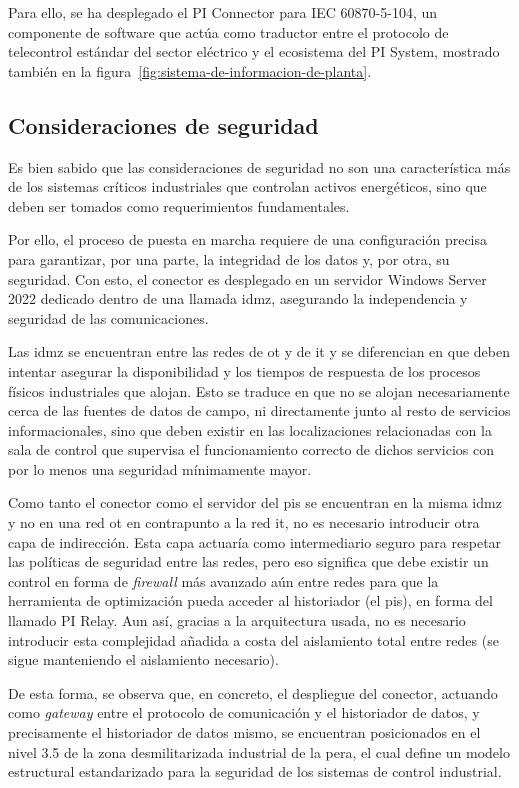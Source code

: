 Para ello, se ha desplegado el PI Connector para IEC 60870{-}5{-}104, un componente de software que actúa como traductor entre el protocolo de telecontrol estándar del sector eléctrico y el ecosistema del PI System, mostrado también en la figura~\ref{fig:sistema-de-informacion-de-planta}.

\subsection{Consideraciones de seguridad}%
\label{makereference3.4.2}

Es bien sabido que las consideraciones de seguridad no son una característica más de los sistemas críticos industriales que controlan activos energéticos, sino que deben ser tomados como requerimientos fundamentales.

Por ello, el proceso de puesta en marcha requiere de una configuración precisa para garantizar, por una parte, la integridad de los datos y, por otra, su seguridad. Con esto, el conector es desplegado en un servidor Windows Server 2022 dedicado dentro de una llamada \gls{idmz}, asegurando la independencia y seguridad de las comunicaciones.

Las \gls{idmz} se encuentran entre las redes de \gls{ot} y de \gls{it} y se diferencian en que deben intentar asegurar la disponibilidad y los tiempos de respuesta de los procesos físicos industriales que alojan. Esto se traduce en que no se alojan necesariamente cerca de las fuentes de datos de campo, ni directamente junto al resto de servicios informacionales, sino que deben existir en las localizaciones relacionadas con la sala de control que supervisa el funcionamiento correcto de dichos servicios con por lo menos una seguridad mínimamente mayor.

Como tanto el conector como el servidor del \gls{pis} se encuentran en la misma \gls{idmz} y no en una red \gls{ot} en contrapunto a la red \gls{it}, no es necesario introducir otra capa de indirección. Esta capa actuaría como intermediario seguro para respetar las políticas de seguridad entre las redes, pero eso significa que debe existir un control en forma de \textit{firewall} más avanzado aún entre redes para que la herramienta de optimización pueda acceder al historiador (el \gls{pis}), en forma del llamado PI Relay. Aun así, gracias a la arquitectura usada, no es necesario introducir esta complejidad añadida a costa del aislamiento total entre redes (se sigue manteniendo el aislamiento necesario).

De esta forma, se observa que, en concreto, el despliegue del conector, actuando como \textit{gateway} entre el protocolo de comunicación y el historiador de datos, y precisamente el historiador de datos mismo, se encuentran posicionados en el nivel 3.5 de la zona desmilitarizada industrial de la \gls{pera}, el cual define un modelo estructural estandarizado para la seguridad de los sistemas de control industrial.

